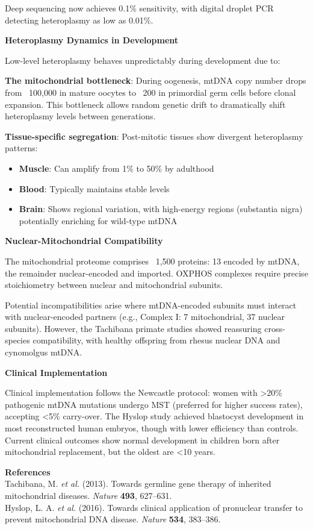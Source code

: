 \begin{technical}
Deep sequencing now achieves 0.1\% sensitivity, with digital droplet PCR detecting heteroplasmy as low as 0.01\%.

\noindent\textbf{Heteroplasmy Dynamics in Development}

Low-level heteroplasmy behaves unpredictably during development due to:

\textbf{The mitochondrial bottleneck}: During oogenesis, mtDNA copy number drops from ~100,000 in mature oocytes to ~200 in primordial germ cells before clonal expansion. This bottleneck allows random genetic drift to dramatically shift heteroplasmy levels between generations.

\textbf{Tissue-specific segregation}: Post-mitotic tissues show divergent heteroplasmy patterns:
\begin{itemize}[leftmargin=*]
\item \textbf{Muscle}: Can amplify from 1\% to 50\% by adulthood
\item \textbf{Blood}: Typically maintains stable levels
\item \textbf{Brain}: Shows regional variation, with high-energy regions (substantia nigra) potentially enriching for wild-type mtDNA
\end{itemize}


\noindent\textbf{Nuclear-Mitochondrial Compatibility}

The mitochondrial proteome comprises ~1,500 proteins: 13 encoded by mtDNA, the remainder nuclear-encoded and imported. OXPHOS complexes require precise stoichiometry between nuclear and mitochondrial subunits.

Potential incompatibilities arise where mtDNA-encoded subunits must interact with nuclear-encoded partners (e.g., Complex I: 7 mitochondrial, 37 nuclear subunits). However, the Tachibana primate studies showed reassuring cross-species compatibility, with healthy offspring from rhesus nuclear DNA and cynomolgus mtDNA.

\noindent\textbf{Clinical Implementation}

Clinical implementation follows the Newcastle protocol: women with >20\% pathogenic mtDNA mutations undergo MST (preferred for higher success rates), accepting <5\% carry-over. The Hyslop study achieved blastocyst development in most reconstructed human embryos, though with lower efficiency than controls. Current clinical outcomes show normal development in children born after mitochondrial replacement, but the oldest are <10 years.

\vspace{0.5em}
\noindent\textbf{References}\\
Tachibana, M. \textit{et al.} (2013). Towards germline gene therapy of inherited mitochondrial diseases. \textit{Nature} \textbf{493}, 627–631.\\
Hyslop, L. A. \textit{et al.} (2016). Towards clinical application of pronuclear transfer to prevent mitochondrial DNA disease. \textit{Nature} \textbf{534}, 383–386.
\end{technical}